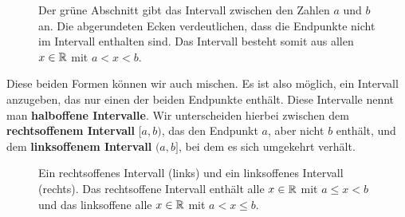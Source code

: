 \documentclass[../../main.tex]{subfiles}
\begin{document}
	\begin{figure}[h]
		\centering
		\caption{Der grüne Abschnitt gibt das Intervall zwischen den Zahlen $a$ und $b$ an. Die abgerundeten Ecken verdeutlichen, dass die Endpunkte nicht im Intervall enthalten sind. Das Intervall besteht somit aus allen $x \in \mathbb{R}$ mit $a < x < b$.}
	\end{figure}

	Diese beiden Formen können wir auch mischen. Es ist also möglich, ein Intervall anzugeben, das nur einen der beiden Endpunkte enthält. Diese Intervalle nennt man \textbf{halboffene Intervalle}. Wir unterscheiden hierbei zwischen dem \textbf{rechtsoffenem Intervall} $[a,b)$, das den Endpunkt $a$, aber nicht $b$ enthält, und dem \textbf{linksoffenem Intervall} $(a,b]$, bei dem es sich umgekehrt verhält.
	
	\begin{figure}[h]
		\centering
		\caption{Ein rechtsoffenes Intervall (links) und ein linksoffenes Intervall (rechts). Das rechtsoffene Intervall enthält alle $x \in \mathbb{R}$ mit $a \leq x < b$ und das linksoffene alle $x \in \mathbb{R}$ mit $a < x \leq b$.}
	\end{figure}
	
\end{document}
